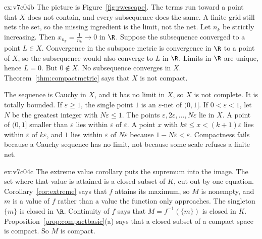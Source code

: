 \begin{solution}{ex:v7c04b}
\idea The picture is Figure~\ref{fig:rwescape}. The terms run toward a point that $X$ does not contain, and every subsequence does the same. A finite grid still nets the set, so the missing ingredient is the limit, not the net.
\writeup Let $n_k$ be strictly increasing. Then $x_{n_k}=\frac1{n_k}\to 0$ in $\R$. Suppose the subsequence converged to a point $L\in X$. Convergence in the subspace metric is convergence in $\R$ to a point of $X$, so the subsequence would also converge to $L$ in $\R$. Limits in $\R$ are unique, hence $L=0$. But $0\notin X$. No subsequence converges in $X$. Theorem~\ref{thm:compactmetric} says that $X$ is not compact.

The sequence is Cauchy in $X$, and it has no limit in $X$, so $X$ is not complete. It is totally bounded. If $\varepsilon\ge 1$, the single point $1$ is an $\varepsilon$-net of $(0,1]$. If $0<\varepsilon<1$, let $N$ be the greatest integer with $N\varepsilon\le 1$. The points $\varepsilon,2\varepsilon,\dots,N\varepsilon$ lie in $X$. A point of $(0,1]$ smaller than $\varepsilon$ lies within $\varepsilon$ of $\varepsilon$. A point $x$ with $k\varepsilon\le x<(k+1)\varepsilon$ lies within $\varepsilon$ of $k\varepsilon$, and $1$ lies within $\varepsilon$ of $N\varepsilon$ because $1-N\varepsilon<\varepsilon$. Compactness fails because a Cauchy sequence has no limit, not because some scale refuses a finite net.
\end{solution}

\begin{solution}{ex:v7c04c}
\idea The extreme value corollary puts the supremum into the image. The set where that value is attained is a closed subset of $K$, cut out by one equation.
\writeup Corollary~\ref{cor:extreme} says that $f$ attains its maximum, so $M$ is nonempty, and $m$ is a value of $f$ rather than a value the function only approaches. The singleton $\{m\}$ is closed in $\R$. Continuity of $f$ says that $M=f^{-1}(\{m\})$ is closed in $K$. Proposition~\ref{prop:compactbasic}(a) says that a closed subset of a compact space is compact. So $M$ is compact.
\end{solution}

